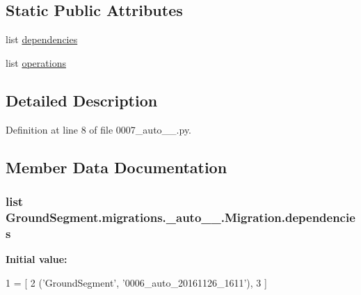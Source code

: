 \subsection*{Static Public Attributes}
\begin{DoxyCompactItemize}
\item 
list \hyperlink{class_ground_segment_1_1migrations_1_10007__auto__20161126__1841_1_1_migration_a3bc43af40c96afe2c0b832d76da32245}{dependencies}
\item 
list \hyperlink{class_ground_segment_1_1migrations_1_10007__auto__20161126__1841_1_1_migration_a9017cc6c49a17d1c4461672a4f3300e8}{operations}
\end{DoxyCompactItemize}


\subsection{Detailed Description}


Definition at line 8 of file 0007\+\_\+auto\+\_\+\_.\+py.



\subsection{Member Data Documentation}
\hypertarget{class_ground_segment_1_1migrations_1_10007__auto__20161126__1841_1_1_migration_a3bc43af40c96afe2c0b832d76da32245}{}
\subsubsection[{dependencies}]{\setlength{\rightskip}{0pt plus 5cm}list Ground\+Segment.\+migrations.\+\_\+auto\+\_\+\_.\+Migration.\+dependencies\hspace{0.3cm}{\ttfamily [static]}}\label{class_ground_segment_1_1migrations_1_10007__auto__20161126__1841_1_1_migration_a3bc43af40c96afe2c0b832d76da32245}
{\bfseries Initial value\+:}
\begin{DoxyCode}
1 = [
2         (\textcolor{stringliteral}{'GroundSegment'}, \textcolor{stringliteral}{'0006\_auto\_20161126\_1611'}),
3     ]
\end{DoxyCode}


